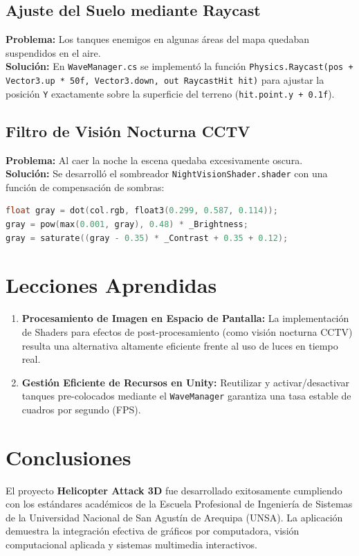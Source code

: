 \documentclass[12pt,a4paper]{article}
\begin{document}
\subsection{Ajuste del Suelo mediante Raycast}
\textbf{Problema:} Los tanques enemigos en algunas áreas del mapa quedaban suspendidos en el aire. \\
\textbf{Solución:} En \texttt{WaveManager.cs} se implementó la función \texttt{Physics.Raycast(pos + Vector3.up * 50f, Vector3.down, out RaycastHit hit)} para ajustar la posición \texttt{Y} exactamente sobre la superficie del terreno (\texttt{hit.point.y + 0.1f}).

\subsection{Filtro de Visión Nocturna CCTV}
\textbf{Problema:} Al caer la noche la escena quedaba excesivamente oscura. \\
\textbf{Solución:} Se desarrolló el sombreador \texttt{NightVisionShader.shader} con una función de compensación de sombras:
\begin{lstlisting}[language=C]
float gray = dot(col.rgb, float3(0.299, 0.587, 0.114));
gray = pow(max(0.001, gray), 0.48) * _Brightness;
gray = saturate((gray - 0.35) * _Contrast + 0.35 + 0.12);
\end{lstlisting}

\section{Lecciones Aprendidas}

\begin{enumerate}
    \item \textbf{Procesamiento de Imagen en Espacio de Pantalla:} La implementación de Shaders para efectos de post-procesamiento (como visión nocturna CCTV) resulta una alternativa altamente eficiente frente al uso de luces en tiempo real.
    \item \textbf{Gestión Eficiente de Recursos en Unity:} Reutilizar y activar/desactivar tanques pre-colocados mediante el \texttt{WaveManager} garantiza una tasa estable de cuadros por segundo (FPS).
\end{enumerate}

\section{Conclusiones}

El proyecto \textbf{Helicopter Attack 3D} fue desarrollado exitosamente cumpliendo con los estándares académicos de la Escuela Profesional de Ingeniería de Sistemas de la Universidad Nacional de San Agustín de Arequipa (UNSA). La aplicación demuestra la integración efectiva de gráficos por computadora, visión computacional aplicada y sistemas multimedia interactivos.
\end{document}
